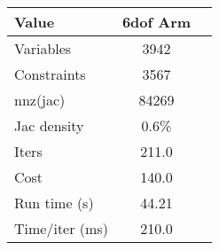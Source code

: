 \begin{tabular}{lcl}
\toprule 
Value & 6dof Arm \\
\midrule 
Variables & 3942 \\
Constraints & 3567 \\
nnz(jac) & 84269 \\
Jac density & 0.6\% \\
Iters & 211.0 \\
Cost & 140.0 \\
Run time (s) & 44.21 \\
Time/iter (ms) & 210.0 \\
\bottomrule 
\end{tabular}

